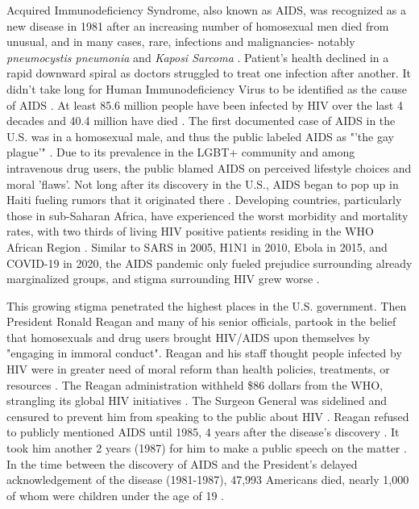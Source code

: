 \documentclass[letterpaper, 11 pt, conference]{ieeeconf}
\begin{document}
Acquired Immunodeficiency Syndrome, also known as AIDS, was recognized as a new disease in 1981 after an increasing number of homosexual men died from unusual, and in many cases, rare, infections and malignancies- notably \emph{pneumocystis pneumonia} and \emph{Kaposi Sarcoma} \cite{OriginsofPandemic, LookBack, Fauci}. Patient's health declined in a rapid downward spiral as doctors struggled to treat one infection after another. It didn't take long for Human Immunodeficiency Virus to be identified as the cause of AIDS \cite{OriginsofPandemic}. At least 85.6 million people have been infected by HIV over the last 4 decades and 40.4 million have died \cite{WHO}. The first documented case of AIDS in the U.S. was in a homosexual male, and thus the public labeled AIDS as "'the gay plague'" \cite{LookBack}. Due to its prevalence in the LGBT+ community and among intravenous drug users, the public blamed AIDS on perceived lifestyle choices and moral 'flaws'. Not long after its discovery in the U.S., AIDS began to pop up in Haiti fueling rumors that it originated there \cite{LookBack}. Developing countries, particularly those in sub-Saharan Africa, have experienced the worst morbidity and mortality rates, with two thirds of living HIV positive patients residing in the WHO African Region \cite{WHO}. Similar to SARS in 2005, H1N1 in 2010, Ebola in 2015, and COVID-19 in 2020, the AIDS pandemic only fueled prejudice surrounding already marginalized groups, and stigma surrounding HIV grew worse \cite{RacialDiscrimination}. 

This growing stigma penetrated the highest places in the U.S. government. Then President Ronald Reagan and many of his senior officials, partook in the belief that homosexuals and drug users brought HIV/AIDS upon themselves by "engaging in immoral conduct". Reagan and his staff thought people infected by HIV were in greater need of moral reform than health policies, treatments, or resources \cite{Koop}. The Reagan administration withheld \$86 dollars from the WHO, strangling its global HIV initiatives \cite{jhu}. The Surgeon General was sidelined and censured to prevent him from speaking to the public about HIV \cite{Koop}. Reagan refused to publicly mentioned AIDS until 1985, 4 years after the disease's discovery \cite{GSU}. It took him another 2 years (1987) for him to make a public speech on the matter \cite{GSU}. In the time between the discovery of AIDS and the President's delayed acknowledgement of the disease (1981-1987), 47,993 Americans died, nearly 1,000 of whom were children under the age of 19 \cite{CDC}.
\end{document}
